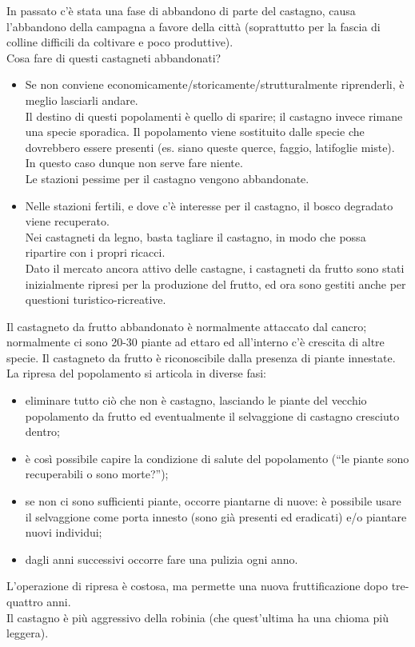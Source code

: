 In passato c'è stata una fase di abbandono di parte del castagno, causa l'abbandono della campagna a favore della città (soprattutto per la fascia di colline difficili da coltivare e poco produttive).\\
Cosa fare di questi castagneti abbandonati? 
\begin{itemize}[nosep]
    \item Se non conviene economicamente/storicamente/strutturalmente riprenderli, è meglio lasciarli andare.\\
    Il destino di questi popolamenti è quello di sparire; il castagno invece rimane una specie sporadica. Il popolamento viene sostituito dalle specie che dovrebbero essere presenti (es. siano queste querce, faggio, latifoglie miste).\\
    In questo caso dunque non serve fare niente.\\
    Le stazioni pessime per il castagno vengono abbandonate.
   \item Nelle stazioni fertili, e dove c'è interesse per il castagno, il bosco degradato viene recuperato.\\
    Nei castagneti da legno, basta tagliare il castagno, in modo che possa ripartire con i propri ricacci.\\
    Dato il mercato ancora attivo delle castagne, i castagneti da frutto sono stati inizialmente ripresi per la produzione del frutto, ed ora sono gestiti anche per questioni turistico-ricreative.\\
\end{itemize}
Il castagneto da frutto abbandonato è normalmente attaccato dal cancro; normalmente ci sono 20-30 piante ad ettaro ed all'interno c'è crescita di altre specie. Il castagneto da frutto è riconoscibile dalla presenza di piante innestate.\\
La ripresa del popolamento si articola in diverse fasi:
\begin{itemize}[nosep]
    \item eliminare tutto ciò che non è castagno, lasciando le piante del vecchio popolamento da frutto ed eventualmente il selvaggione di castagno cresciuto dentro;
    \item è così possibile capire la condizione di salute del popolamento (``le piante sono recuperabili o sono morte?'');
    \item se non ci sono sufficienti piante, occorre piantarne di nuove: è possibile usare il selvaggione come porta innesto (sono già presenti ed eradicati) e/o piantare nuovi individui;
    \item dagli anni successivi occorre fare una pulizia ogni anno.
\end{itemize}
L'operazione di ripresa è costosa, ma permette una nuova fruttificazione dopo tre-quattro anni.\\ 
Il castagno è più aggressivo della robinia (che quest'ultima ha una chioma più leggera).
